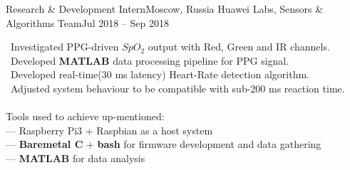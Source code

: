 \resumeSubheading
    {Research \& Development Intern}{Moscow, Russia}
    {Huawei Labs, Sensors \& Algorithms Team}{Jul 2018 -- Sep 2018}
    \begin{itemize}[leftmargin=0in, label={}]
        \small{\item{
            {\textbullet \ Investigated PPG-driven $SpO_{2}$ output with Red, Green and IR channels.}\\
            {\textbullet \ Developed \textbf{MATLAB} data processing pipeline for PPG signal.}\\
            {\textbullet \ Developed real-time(30 ms latency) Heart-Rate detection algorithm.}\\
            {\textbullet \ Adjusted system behaviour to be compatible with sub-200 ms reaction time. }\\
            {\ }\\
            {Tools used to achieve up-mentioned:}\\
            {— Raspberry Pi3 + Raspbian as a host system }\\
            {— \textbf{Baremetal C} + \textbf{bash} for firmware development and data gathering}\\
            {— \textbf{MATLAB} for data analysis}\\
        }}
    \end{itemize}
